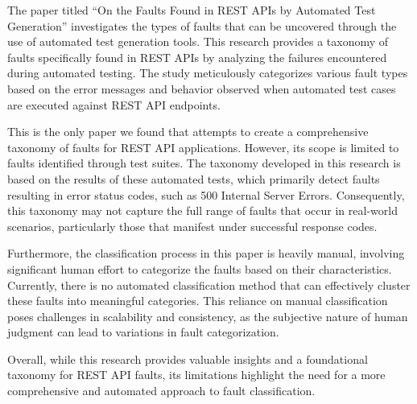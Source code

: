 \documentclass[conference]{IEEEtran}
\begin{document}


The paper titled “On the Faults Found in REST APIs by Automated Test Generation” \cite{automatedTestTaxonomy} investigates the types of faults that can be uncovered through the use of automated test generation tools. This research provides a taxonomy of faults specifically found in REST APIs by analyzing the failures encountered during automated testing. The study meticulously categorizes various fault types based on the error messages and behavior observed when automated test cases are executed against REST API endpoints.

This is the only paper we found that attempts to create a comprehensive taxonomy of faults for REST API applications. However, its scope is limited to faults identified through test suites. The taxonomy developed in this research is based on the results of these automated tests, which primarily detect faults resulting in error status codes, such as 500 Internal Server Errors. Consequently, this taxonomy may not capture the full range of faults that occur in real-world scenarios, particularly those that manifest under successful response codes.

Furthermore, the classification process in this paper is heavily manual, involving significant human effort to categorize the faults based on their characteristics. Currently, there is no automated classification method that can effectively cluster these faults into meaningful categories. This reliance on manual classification poses challenges in scalability and consistency, as the subjective nature of human judgment can lead to variations in fault categorization.

Overall, while this research provides valuable insights and a foundational taxonomy for REST API faults, its limitations highlight the need for a more comprehensive and automated approach to fault classification. 
\end{document}
